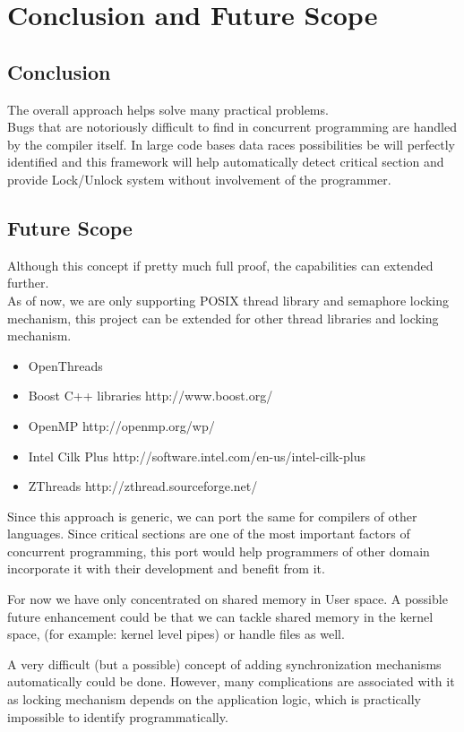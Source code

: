\chapter{Conclusion and Future Scope}

\section{Conclusion}
The overall approach helps solve many practical problems. \\
Bugs that are notoriously difficult to find in concurrent programming are handled by the compiler itself. In large code bases data races possibilities be will perfectly identified and this framework will help automatically detect critical section and provide Lock/Unlock system without involvement of the programmer.

\section{Future Scope}
Although this concept if pretty much full proof, the capabilities can extended further.\\
As of now, we are only supporting POSIX thread library and semaphore locking mechanism, this project can be extended for other thread libraries and locking mechanism.
\begin{itemize}
\item OpenThreads
\item Boost C++ libraries http://www.boost.org/
\item OpenMP http://openmp.org/wp/
\item Intel Cilk Plus http://software.intel.com/en-us/intel-cilk-plus
\item ZThreads http://zthread.sourceforge.net/
\end{itemize}

Since this approach is generic, we can port the same for compilers of other languages. Since critical sections are one of the most important factors of concurrent programming, this port would help programmers of other domain incorporate it with their development and benefit from it.

For now we have only concentrated on shared memory in User space. A possible future enhancement could be that we can tackle shared memory in the kernel space, (for example: kernel level pipes) or handle files as well.

A very difficult (but a possible) concept of adding synchronization mechanisms automatically could be done. However, many complications are associated with it as locking mechanism depends on the application logic, which is practically impossible to identify programmatically.


